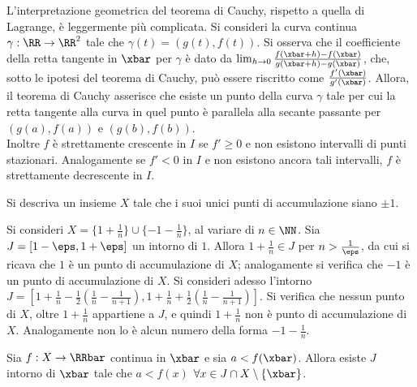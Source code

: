 \documentclass[11pt]{article}
\begin{document}
	\begin{remark}\nl
		\li L'interpretazione geometrica del teorema di Cauchy, rispetto
		a quella di Lagrange, è leggermente più complicata. Si consideri
		la curva continua $\gamma : \RR \to \RR^2$ tale che
		$\gamma(t) =(g(t), f(t))$. Si osserva che il coefficiente della
		retta tangente in $\xbar$ per $\gamma$ è dato da $\lim_{h \to 0} \frac{f(\xbar + h) - f(\xbar)}{g(\xbar + h) - g(\xbar)}$, che,
		sotto le ipotesi del teorema di Cauchy, può essere riscritto
		come $\frac{f'(\xbar)}{g'(\xbar)}$. Allora, il teorema di Cauchy
		asserisce che esiste un punto della curva $\gamma$ tale per cui
		la retta tangente alla curva in quel punto è parallela alla secante
		passante per $(g(a), f(a))$ e $(g(b), f(b))$. \\
		
		\li Inoltre $f$ è strettamente crescente in $I$ se $f' \geq 0$ e
		non esistono intervalli di punti stazionari. Analogamente se $f' < 0$ in
		$I$ e non esistono ancora tali intervalli, $f$ è strettamente decrescente in $I$.
	\end{remark}

	\begin{exercise}
		Si descriva un insieme $X$ tale che i suoi unici punti di accumulazione
		siano $\pm 1$.
	\end{exercise}

	\begin{solution}
		Si consideri $X = \{1 + \frac{1}{n}\} \cup \{-1 - \frac{1}{n}\}$, al variare di $n \in \NN$. Sia
		$J = [1 - \eps, 1 + \eps]$ un intorno di $1$. Allora $1 + \frac{1}{n} \in J$ per $n > \frac{1}{\eps}$,
		da cui si ricava che $1$ è un punto di accumulazione di $X$; analogamente si verifica che $-1$ è
		un punto di accumulazione di $X$. Si consideri adesso l'intorno $J = \left[1 + \frac{1}{n} - \frac{1}{2} \left( \frac{1}{n} - \frac{1}{n+1} \right), 1 + \frac{1}{n} + \frac{1}{2} \left( \frac{1}{n} - \frac{1}{n+1} \right) \right]$. Si verifica che nessun punto di $X$, oltre $1 + \frac{1}{n}$ appartiene a $J$, e quindi
		$1 + \frac{1}{n}$ non è punto di accumulazione di $X$. Analogamente non lo è alcun numero della forma
		$-1 - \frac{1}{n}$.
	\end{solution}

	\begin{exercise}
		Sia $f : X \to \RRbar$ continua in $\xbar$ e sia $a < f(\xbar)$.
		Allora esiste $J$ intorno di $\xbar$ tale che $a < f(x)$ $\forall
		x \in J \cap X \setminus \{\xbar\}$.
	\end{exercise}
\end{document}

